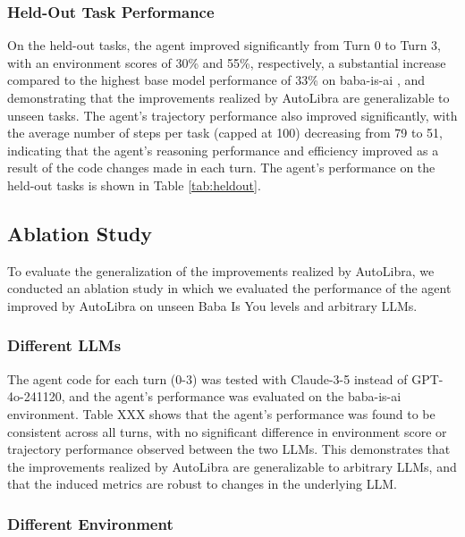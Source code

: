 \subsubsection{Held-Out Task Performance}

On the held-out tasks, the agent improved significantly from Turn 0 to Turn 3, with an environment scores of 30\% and 55\%, respectively, a substantial increase compared to the highest base model performance of 33\% on baba-is-ai \cite{paglieri2024balrog}, and demonstrating that the improvements realized by AutoLibra are generalizable to unseen tasks. The agent's trajectory performance also improved significantly, with the average number of steps per task (capped at 100) decreasing from 79 to 51, indicating that the agent's reasoning performance and efficiency improved as a result of the code changes made in each turn. The agent's performance on the held-out tasks is shown in Table \ref{tab:heldout}.


\subsection{Ablation Study}

To evaluate the generalization of the improvements realized by AutoLibra, we conducted an ablation study in which we evaluated the performance of the agent improved by AutoLibra on unseen Baba Is You levels and arbitrary LLMs.

\subsubsection{Different LLMs}

The agent code for each turn (0-3) was tested with Claude-3-5 instead of GPT-4o-241120, and the agent's performance was evaluated on the baba-is-ai environment. Table XXX shows that the agent's performance was found to be consistent across all turns, with no significant difference in environment score or trajectory performance observed between the two LLMs. This demonstrates that the improvements realized by AutoLibra are generalizable to arbitrary LLMs, and that the induced metrics are robust to changes in the underlying LLM.

\subsubsection{Different Environment}


